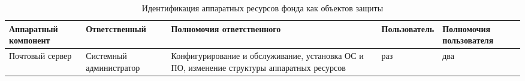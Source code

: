 \label{AppendixA}

\begin{sidewaystable}[h]
\begin{longtable}{|p{}|p{}|
    p{}|p{}|p{}|}
\caption{Идентификация аппаратных ресурсов фонда как объектов
  защиты} 
\label{hardware} \\\hline 

Аппаратный компонент & Ответственный & Полномочия ответственного &
Пользователь & Полномочия пользователя\\\hline

Почтовый сервер & Системный администратор & Конфигурирование и
обслуживание, установка ОС и ПО, изменение структуры аппаратных
ресурсов & раз & два\\\hline
\end{longtable}
\end{sidewaystable}

\newpage


